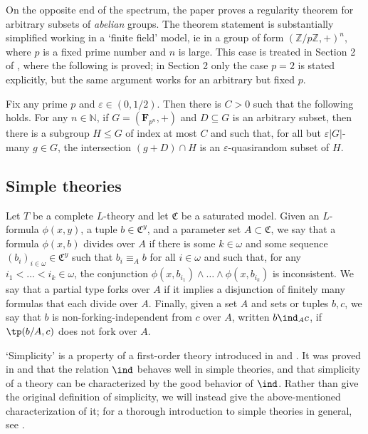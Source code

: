 \documentclass[10pt]{article}
\begin{document}
{On the opposite end of the spectrum, the paper \cite{green} proves a regularity theorem for arbitrary subsets of \textit{abelian} groups. The theorem statement is substantially simplified working in a `finite field' model, ie in a group of form $(\mathbb{Z}/p\mathbb{Z},+)^n$, where $p$ is a fixed prime number and $n$ is large. This case is treated in Section 2 of \cite{green}, where the following is proved; in Section 2 only the case $p=2$ is stated explicitly, but the same argument works for an arbitrary but fixed $p$. %

\begin{fact}\label{green_theorem}
    Fix any prime $p$ and $\varepsilon\in(0,1/2)$. Then there is $C>0$ such that the following holds. For any $n\in\mathbb{N}$, if $G=(\mathbf{F}_{p^n},+)$ and $D\subseteq G$ is an arbitrary subset, then there is a subgroup $H\leqslant G$ of index at most $C$ and such that, for all but $\varepsilon|G|$-many $g\in G$, the intersection $(g+D)\cap H$ is an $\varepsilon$-quasirandom subset of $H$.
\end{fact}


\subsection{Simple theories}
Let $T$ be a complete $L$-theory and let $\mathfrak{C}$ be a saturated model. Given an $L$-formula $\phi(x,y)$, a tuple $b\in\mathfrak{C}^{y}$, and a parameter set $A\subset\mathfrak{C}$, we say that a formula $\phi(x,b)$ divides over $A$ if there is some $k\in\omega$ and some sequence $(b_i)_{i\in\omega}\in\mathfrak{C}^y$ such that $b_i\equiv_A b$ for all $i\in\omega$ and such that, for any $i_1<\dots<i_k\in\omega$, the conjunction $\phi(x,b_{i_1})\wedge\dots\wedge\phi(x,b_{i_k})$ is inconsistent. We say that a partial type forks over $A$ if it implies a disjunction of finitely many formulas that each divide over $A$. Finally, given a set $A$ and sets or tuples $b,c$, we say that $b$ is non-forking-independent from $c$ over $A$, written $b\ind_A c$, if $\tp(b/A,c)$ does not fork over $A$.

`Simplicity' is a property of a first-order theory introduced in \cite{shelah_1} and \cite{shelah_2}. It was proved in \cite{kim} and \cite{kim_pillay} that the relation $\ind$ behaves well in simple theories, and that simplicity of a theory can be characterized by the good behavior of $\ind$. Rather than give the original definition of simplicity, we will instead give the above-mentioned characterization of it; for a thorough introduction to simple theories in general, see \cite{wagner}.

}
\end{document}
